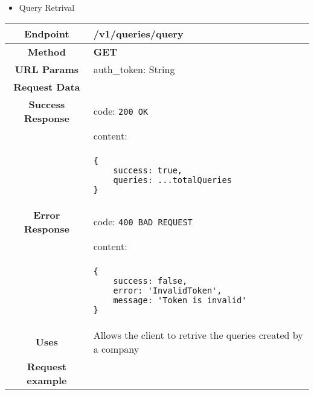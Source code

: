     \begin{itemize}
        \item Query Retrival
    \end{itemize}
    \begin{adjustwidth}{1cm}{}
        \begin{longtable}{|c|l|}
            \hline
            \textbf{Endpoint} & /v1/queries/query \\
            \hline
            \textbf{Method} & \textbf{GET} \\
            \hline
            \textbf{URL Params} &  auth\_token: String \\
            \hline
            \textbf{Request Data} & \\
            \hline
            \textbf{Success Response} & code: \texttt{200 OK} \\
            &                           content: \\
            & \begin{minipage}[t]{0.5\textwidth}
                \begin{adjustwidth}{1.5cm}{}
                \begin{verbatim}
{
    success: true, 
    queries: ...totalQueries
}
                \end{verbatim}
                \end{adjustwidth}
              \end{minipage} \\
              \hline
            \textbf{Error Response} & code: \texttt{400 BAD REQUEST} \\
              &                     content: \\
              & \begin{minipage}[t]{0.7\textwidth}
                \begin{adjustwidth}{1.5cm}{}
                \begin{verbatim}
{
    success: false, 
    error: 'InvalidToken',
    message: 'Token is invalid'
}
                \end{verbatim}
                \end{adjustwidth}
                 \vspace{4pt}
              \end{minipage} \\
              \hline
            \textbf{Uses} & Allows the client to retrive the queries created by a company \\
            \hline
                           \textbf{Request example}

\end{longtable}
\end{adjustwidth}
